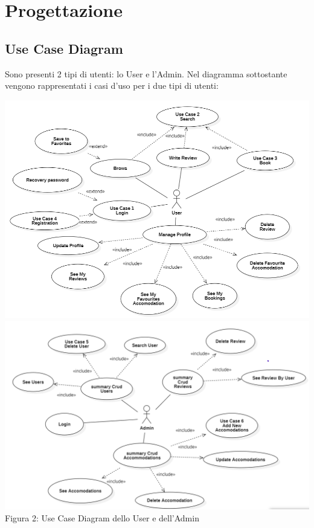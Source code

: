 \documentclass[10pt]{article}
\begin{document}
\section{Progettazione}
\subsection{Use Case Diagram}

Sono presenti 2 tipi di utenti: lo User e l'Admin. Nel diagramma sottostante vengono rappresentati i casi d'uso per i due tipi di utenti: 
\begin{center}
\hspace*{-1cm}
\includegraphics[scale=0.5]{usecases/ClientUseCase}
\hspace*{-1cm}
\includegraphics[scale=0.5]{usecases/AdminUseCase}\\
Figura 2: Use Case Diagram dello User e dell'Admin
\end{center}
\label{usecase}
\end{document}
